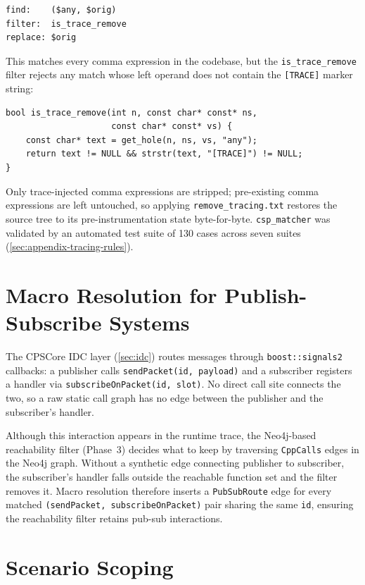 \begin{verbatim}
find:    ($any, $orig)
filter:  is_trace_remove
replace: $orig
\end{verbatim}

This matches every comma expression in the codebase, but the
\texttt{is\_trace\_remove} filter rejects any match whose left operand
does not contain the \texttt{[TRACE]} marker string:

\begin{verbatim}
bool is_trace_remove(int n, const char* const* ns,
                     const char* const* vs) {
    const char* text = get_hole(n, ns, vs, "any");
    return text != NULL && strstr(text, "[TRACE]") != NULL;
}
\end{verbatim}

Only trace-injected comma expressions are stripped; pre-existing comma
expressions are left untouched, so applying
\texttt{remove\_tracing.txt} restores the source tree to its
pre-instrumentation state byte-for-byte. \texttt{csp\_matcher} was
validated by an automated test suite of 130 cases across seven suites
(\cref{sec:appendix-tracing-rules}).

\section{Macro Resolution for Publish-Subscribe Systems}\label{sec:macro-resolution}

The CPSCore IDC layer (\cref{sec:idc}) routes messages through
\texttt{boost::signals2} callbacks: a publisher calls
\texttt{sendPacket(id, payload)} and a subscriber registers a handler
via \texttt{subscribeOnPacket(id, slot)}. No direct call site connects
the two, so a raw static call graph has no edge between the publisher
and the subscriber's handler.

Although this interaction appears in the runtime trace, the
Neo4j-based reachability filter (Phase~3) decides what to keep by
traversing \texttt{CppCalls} edges in the Neo4j graph. Without a
synthetic edge connecting publisher to subscriber, the subscriber's
handler falls outside the reachable function set and the filter removes
it. Macro resolution therefore inserts a \texttt{PubSubRoute} edge for
every matched \texttt{(sendPacket, subscribeOnPacket)} pair sharing the
same \texttt{id}, ensuring the reachability filter retains pub-sub
interactions.

\section{Scenario Scoping}\label{sec:combine-scope}

